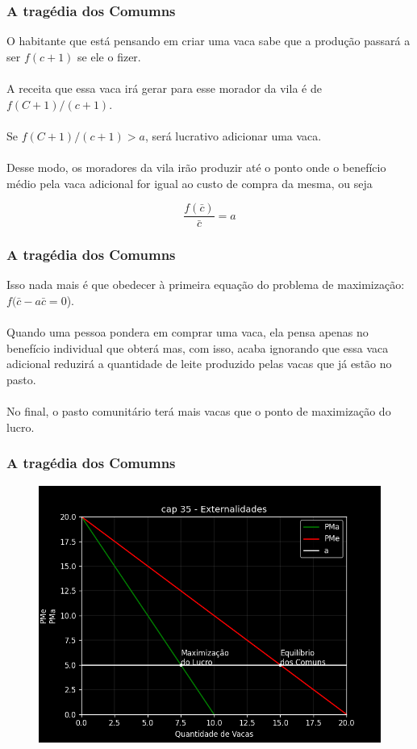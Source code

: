 \documentclass{beamer}[10]
\begin{document}
\begin{frame}
	\frametitle{A tragédia dos Comumns}

	O habitante que está pensando em criar uma vaca sabe que a produção passará a ser $f(c+1)$ se ele o fizer.
	\\~\\
	A receita que essa vaca irá gerar para esse morador da vila é de $f(C+1)/(c+1)$.
	\\~\\
	Se $f(C+1)/(c+1) > a$, será lucrativo adicionar uma vaca.
	\\~\\
	Desse modo, os moradores da vila irão produzir até o ponto onde o benefício médio pela vaca adicional for igual ao custo de compra da mesma, ou seja

	$$ \frac{f(\bar{c})}{\bar{c}} = a $$


\end{frame}

\begin{frame}
	\frametitle{A tragédia dos Comumns}

	Isso nada mais é que obedecer à primeira equação do problema de maximização: $f(\bar{c} - a\bar{c} = 0$).
	\\~\\
	Quando uma pessoa pondera em comprar uma vaca, ela pensa apenas no benefício individual que obterá mas, com isso, acaba ignorando que essa vaca adicional reduzirá a quantidade de leite produzido pelas vacas que já estão no pasto.
	\\~\\
	No final, o pasto comunitário terá mais vacas que o ponto de maximização do lucro.

\end{frame}

\begin{frame}
	\frametitle{A tragédia dos Comumns}

	\begin{figure}[H]
		\centering
		\includegraphics[scale=0.6]{cap35_6-tragedia_comum.png}
	\end{figure}

\end{frame}
\end{document}
